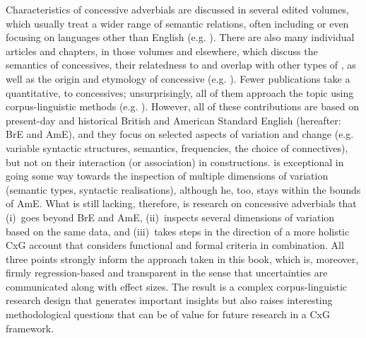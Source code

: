 Characteristics of concessive adverbials are discussed in several edited volumes, which usually treat a wider range of semantic relations, often including or even focusing on languages other than English (e.g. \citealt{Kortmann1996,Rudolph1996,vanderAuwera1998,Couper-KuhlenKortmann2000,Ferraresi2011}). There are also many individual articles and chapters, in those volumes and elsewhere, which discuss the semantics of concessives, their relatedness to and overlap with other types of , as well as the origin and etymology of concessive  (e.g. \citealt{König1985,König1988,Hermodsson1994,Azar1997,DiMeola1998,KönigSiemund2000}). Fewer publications take a quantitative,  to concessives; unsurprisingly, all of them approach the topic using corpus-linguistic methods (e.g. \citealt{Altenberg1986,Aarts1988,Rissanen2002,Hoffmann2005,Berlage2009,Hilpert2013a}). However, all of these contributions are based on present-day and historical British and American Standard English (hereafter: BrE and AmE), and they focus on selected aspects of variation and change (e.g. variable syntactic structures, semantics, frequencies, the choice of connectives), but not on their interaction (or association) in constructions. \citet{Hilpert2013a} is exceptional in going some way towards the inspection of multiple dimensions of variation (semantic types, syntactic realisations), although he, too, stays within the bounds of AmE. What is still lacking, therefore, is research on concessive adverbials that
(i)~goes beyond BrE and AmE,
(ii)~inspects several dimensions of variation based on the same data, and
(iii)~takes steps in the direction of a more holistic CxG account that considers functional and formal criteria in combination. All three points strongly inform the approach taken in this book, which is, moreover, firmly regression-based and transparent in the sense that uncertainties are communicated along with effect sizes. The result is a complex corpus-linguistic research design that generates important insights but also raises interesting methodological questions that can be of value for future research in a CxG framework.

